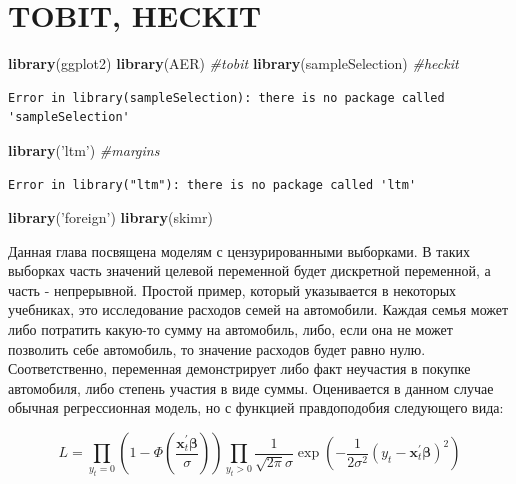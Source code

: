\documentclass[]{book}
\newenvironment{Shaded}{\begin{snugshade}}{\end{snugshade}}
\newcommand{\CommentTok}[1]{\textcolor[rgb]{0.56,0.35,0.01}{\textit{#1}}}
\newcommand{\KeywordTok}[1]{\textcolor[rgb]{0.13,0.29,0.53}{\textbf{#1}}}
\newcommand{\NormalTok}[1]{#1}
\newcommand{\StringTok}[1]{\textcolor[rgb]{0.31,0.60,0.02}{#1}}
\begin{document}
\hypertarget{tobit_heckit}{%
\chapter{TOBIT, HECKIT}\label{tobit_heckit}}

\begin{Shaded}
\begin{Highlighting}[]
\KeywordTok{library}\NormalTok{(ggplot2)}
\KeywordTok{library}\NormalTok{(AER) }\CommentTok{#tobit}
\KeywordTok{library}\NormalTok{(sampleSelection) }\CommentTok{#heckit}
\end{Highlighting}
\end{Shaded}

\begin{verbatim}
Error in library(sampleSelection): there is no package called 'sampleSelection'
\end{verbatim}

\begin{Shaded}
\begin{Highlighting}[]
\KeywordTok{library}\NormalTok{(}\StringTok{'ltm'}\NormalTok{) }\CommentTok{#margins}
\end{Highlighting}
\end{Shaded}

\begin{verbatim}
Error in library("ltm"): there is no package called 'ltm'
\end{verbatim}

\begin{Shaded}
\begin{Highlighting}[]
\KeywordTok{library}\NormalTok{(}\StringTok{'foreign'}\NormalTok{)}
\KeywordTok{library}\NormalTok{(skimr)}
\end{Highlighting}
\end{Shaded}

Данная глава посвящена моделям с цензурированными выборками. В таких выборках часть значений целевой переменной будет дискретной переменной, а часть - непрерывной. Простой пример, который указывается в некоторых учебниках, это исследование расходов семей на автомобили. Каждая семья может либо потратить какую-то сумму на автомобиль, либо, если она не может позволить себе автомобиль, то значение расходов будет равно нулю. Соответственно, переменная демонстрирует либо факт неучастия в покупке автомобиля, либо степень участия в виде суммы. Оценивается в данном случае обычная регрессионная модель, но с функцией правдоподобия следующего вида:

\begin{equation}
L=\prod_{y_{t}=0}\left(1-\Phi\left(\frac{\boldsymbol{x}_{t}^{\prime} \boldsymbol{\beta}}{\sigma}\right)\right) \prod_{y_{t}>0} \frac{1}{\sqrt{2 \pi} \sigma} \exp \left(-\frac{1}{2 \sigma^{2}}\left(y_{t}-\boldsymbol{x}_{t}^{\prime} \boldsymbol{\beta}\right)^{2}\right)
\end{equation}
\end{document}
